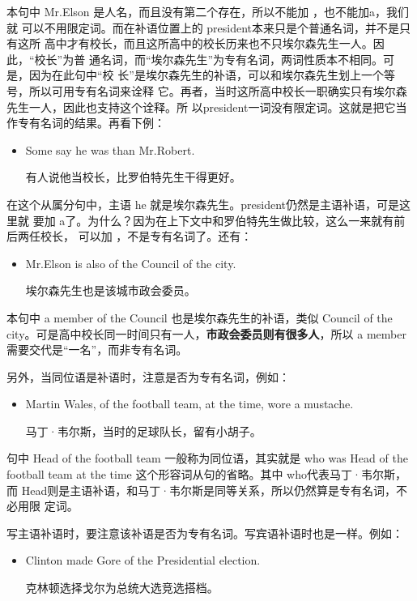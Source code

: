 本句中 Mr.Elson 是人名，而且没有第二个存在，所以不能加 ，也不能加a，我们就
可以不用限定词。而在补语位置上的 president本来只是个普通名词，并不是只有这所
高中才有校长，而且这所高中的校长历来也不只埃尔森先生一人。因此，“校长”为普
通名词，而“埃尔森先生”为专有名词，两词性质本不相同。可是，因为在此句中“校
长”是埃尔森先生的补语，可以和埃尔森先生划上一个等号，所以可用专有名词来诠释
它。再者，当时这所高中校长一职确实只有埃尔森先生一人，因此也支持这个诠释。所
以president一词没有限定词。这就是把它当作专有名词的结果。再看下例：

\begin{itemize}
\item Some say he was  than Mr.Robert.

  有人说他当校长，比罗伯特先生干得更好。
\end{itemize}

在这个从属分句中，主语 he 就是埃尔森先生。president仍然是主语补语，可是这里就
要加 a了。为什么？因为在上下文中和罗伯特先生做比较，这么一来就有前后两任校长，
可以加 ，不是专有名词了。还有：

\begin{itemize}
\item  Mr.Elson is also  of the Council of the city.

  埃尔森先生也是该城市政会委员。
\end{itemize}

本句中 a member of the Council 也是埃尔森先生的补语，类似 Council of the
city。可是高中校长同一时间只有一人，\textbf{市政会委员则有很多人}，所以 a
member需要交代是“一名”，而非专有名词。

另外，当同位语是补语时，注意是否为专有名词，例如：

\begin{itemize}
\item Martin Wales,  of the football team, at the time, wore a
  mustache.

  马丁·韦尔斯，当时的足球队长，留有小胡子。
\end{itemize}

句中 Head of the football team 一般称为同位语，其实就是 who was Head of the
football team at the time 这个形容词从句的省略。其中 who代表马丁·韦尔斯，
而 Head则是主语补语，和马丁·韦尔斯是同等关系，所以仍然算是专有名词，不必用限
定词。

写主语补语时，要注意该补语是否为专有名词。写宾语补语时也是一样。例如：

\begin{itemize}
\item  Clinton made Gore  of the Presidential election.

  克林顿选择戈尔为总统大选竞选搭档。
\end{itemize}

